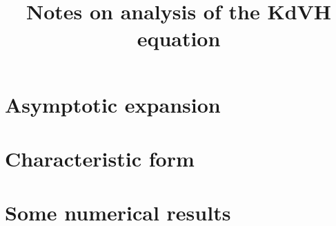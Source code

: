 \documentclass{article}
\title{Notes on analysis of the KdVH equation}
\begin{document}
\maketitle

\section{Asymptotic expansion}

\section{Characteristic form}

\section{Some numerical results}
\end{document}
